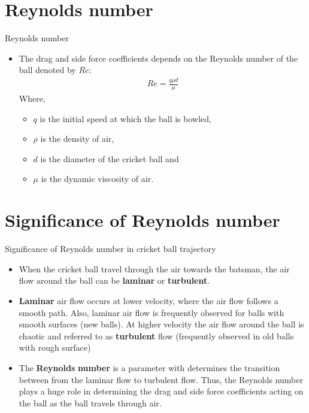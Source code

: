 \documentclass{beamer}
\begin{document}
\section{Reynolds number}
\begin{frame}{Reynolds number}
    \begin{itemize}
    \item 
    The drag and side force coefficients depends on the Reynolds number of the ball denoted by $Re$:
    \begin{align}
        Re = \frac{q\rho d}{\mu}
    \end{align}
    Where, 
    \begin{itemize}
        \item $q$ is the initial speed at which the ball is bowled,
        \item $\rho$ is the density of air, 
        \item $d$ is the diameter of the cricket ball and 
        \item $\mu$ is the dynamic viscosity of air.
    \end{itemize}
  \end{itemize}
\end{frame} 
\section{Significance of Reynolds number}
\begin{frame}{Significance of Reynolds number in cricket ball trajectory}
    \begin{itemize}
    \item 
    When the cricket ball travel through the air towards the batsman, the air flow around the ball can be \textbf{laminar} or \textbf{turbulent}.
    \item
    \textbf{Laminar} air flow occurs at lower velocity, where the air flow follows a smooth path. Also, laminar air flow is frequently observed for balls with smooth surfaces (new balls). At higher velocity the air flow around the ball is chaotic and referred to as \textbf{turbulent} flow (frequently observed in old balls with rough surface)
    \item
    The \textbf{Reynolds} \textbf{number} is a parameter with determines the transition between from the laminar flow to turbulent flow. Thus, the Reynolds number plays a huge role in determining the drag and side force coefficients acting on the ball as the ball travels through air.
  \end{itemize}
\end{frame} 
\end{document}
